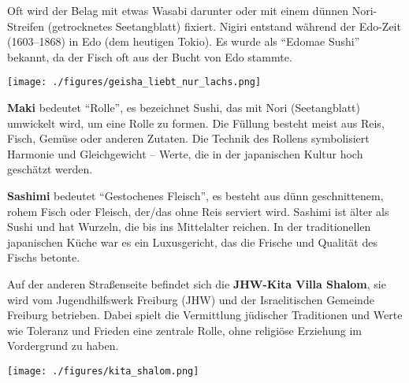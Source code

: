 \documentclass[landscape, a4paper]{article}
\newcommand\alert[1]{\textcolor{PrimaryColor}{\textbf{#1}}}
\begin{document}
\hspace{0.4cm}
\begin{minipage}[t]{0.32\textwidth}
	\vspace{0cm}
	\setlength{\parskip}{0.25cm}

Oft wird der Belag mit etwas Wasabi darunter oder mit einem dünnen Nori-Streifen (getrocknetes Seetangblatt) fixiert. Nigiri entstand während der Edo-Zeit (1603–1868) in Edo (dem heutigen Tokio). Es wurde als \enquote{Edomae Sushi} bekannt, da der Fisch oft aus der Bucht von Edo stammte.

	\texttt{[image: ./figures/geisha\_liebt\_nur\_lachs.png]}
	\setlength{\parskip}{0.25cm}

  \alert{Maki} bedeutet \enquote{Rolle}, es bezeichnet Sushi, das mit Nori (Seetangblatt) umwickelt wird, um eine Rolle zu formen. Die Füllung besteht meist aus Reis, Fisch, Gemüse oder anderen Zutaten. Die Technik des Rollens symbolisiert Harmonie und Gleichgewicht – Werte, die in der japanischen Kultur hoch geschätzt werden.

  \alert{Sashimi} bedeutet \enquote{Gestochenes Fleisch}, es besteht aus dünn geschnittenem, rohem Fisch oder Fleisch, der/das ohne Reis serviert wird. Sashimi ist älter als Sushi und hat Wurzeln, die bis ins Mittelalter reichen. In der traditionellen japanischen Küche war es ein Luxusgericht, das die Frische und Qualität des Fischs betonte. %

  Auf der anderen Straßenseite befindet sich die \alert{JHW-Kita Villa Shalom}, sie wird vom Jugendhilfswerk Freiburg (JHW) und der Israelitischen Gemeinde Freiburg betrieben. Dabei spielt die Vermittlung jüdischer Traditionen und Werte wie Toleranz und Frieden eine zentrale Rolle, ohne religiöse Erziehung im Vordergrund zu haben.

	\texttt{[image: ./figures/kita\_shalom.png]}
	\setlength{\parskip}{0.25cm}
\end{minipage}
\end{document}
